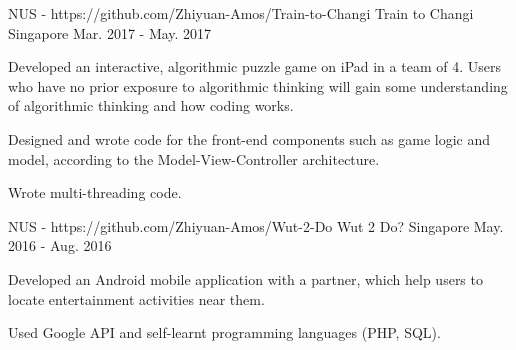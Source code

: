 

\begin{cventries}

  \cventry
    {NUS - https://github.com/Zhiyuan-Amos/Train-to-Changi} %
    {Train to Changi} %
    {Singapore} %
    {Mar. 2017 - May. 2017} %
    {
      \begin{cvitems} %
        \item {Developed an interactive, algorithmic puzzle game on iPad in a team of 4. Users who have no prior exposure to algorithmic thinking will gain some understanding of algorithmic thinking and how coding works.}
        \item {Designed and wrote code for the front-end components such as game logic and model, according to the Model-View-Controller architecture.}
        \item {Wrote multi-threading code.}
      \end{cvitems}
    }
  \cventry
    {NUS - https://github.com/Zhiyuan-Amos/Wut-2-Do} %
    {Wut 2 Do?} %
    {Singapore} %
    {May. 2016 - Aug. 2016} %
    {
      \begin{cvitems} %
        \item {Developed an Android mobile application with a partner, which help users to locate entertainment activities near them.}
        \item {Used Google API and self-learnt programming languages (PHP, SQL).}
      \end{cvitems}
    }
\end{cventries}
